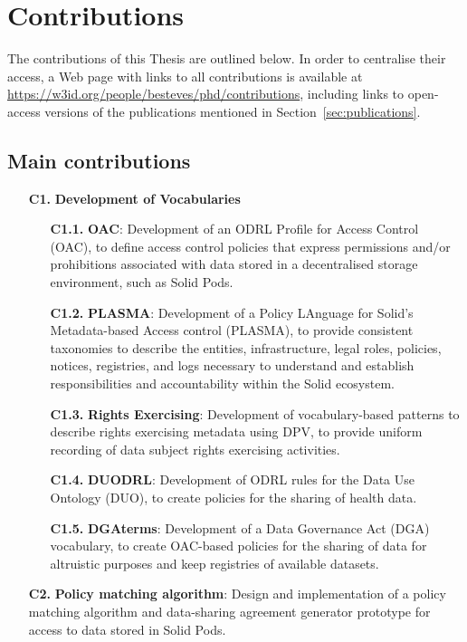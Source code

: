\section{Contributions}
\label{sec:contributions}

The contributions of this Thesis are outlined below.
In order to centralise their access, a Web page with links to all contributions is available at \url{https://w3id.org/people/besteves/phd/contributions}, including links to open-access versions of the publications mentioned in Section~\ref{sec:publications}.

\subsection{Main contributions}
\label{sec:contr_main}

\begin{enumerate}
    \item [\textbf{C1.}] \textbf{Development of Vocabularies}
    \begin{enumerate}
        \item [\textbf{C1.1.}] \textbf{OAC}: Development of an ODRL Profile for Access Control (OAC), to define access control policies that express permissions and/or prohibitions associated with data stored in a decentralised storage environment, such as Solid Pods.
        \item [\textbf{C1.2.}] \textbf{PLASMA}: Development of a Policy LAnguage for Solid’s Metadata-based Access control (PLASMA), to provide consistent taxonomies to describe the entities, infrastructure, legal roles, policies, notices, registries, and logs necessary to understand and establish responsibilities and accountability within the Solid ecosystem.
        \item [\textbf{C1.3.}] \textbf{Rights Exercising}: Development of vocabulary-based patterns to describe rights exercising metadata using DPV, to provide uniform recording of data subject rights exercising activities.
        \item [\textbf{C1.4.}] \textbf{DUODRL}: Development of ODRL rules for the Data Use Ontology (DUO), to create policies for the sharing of health data.
        \item [\textbf{C1.5.}] \textbf{DGAterms}: Development of a Data Governance Act (DGA) vocabulary, to create OAC-based policies for the sharing of data for altruistic purposes and keep registries of available datasets.
    \end{enumerate}
    \item [\textbf{C2.}] \textbf{Policy matching algorithm}: Design and implementation of a policy matching algorithm and data-sharing agreement generator prototype for access to data stored in Solid Pods.
\end{enumerate}

